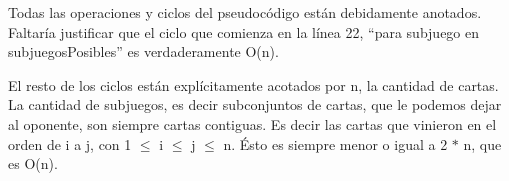 \documentclass[11pt, a4paper, twoside]{article}
\begin{document}
{}

Todas las operaciones y ciclos del pseudocódigo están debidamente anotados. Faltaría justificar que el ciclo que comienza en la línea 22, ``para subjuego en subjuegosPosibles'' es verdaderamente O(n).

El resto de los ciclos están explícitamente acotados por n, la cantidad de cartas.
La cantidad de subjuegos, es decir subconjuntos de cartas, que le podemos dejar al oponente, son siempre cartas contiguas. Es decir las cartas que vinieron en el orden de i a j, con 1 $\leq$ i $\leq$ j $\leq$ n. Ésto es siempre menor o igual a 2 $*$ n, que es O(n).
\end{document}
